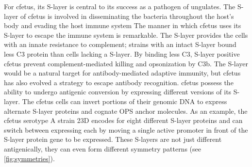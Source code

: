   For \ac{cfetus}, its \ac{S-layer} is central to its success as a pathogen of ungulates. The \ac{S-layer} of \ac{cfetus} is involved in disseminating the bacteria throughout the host's body and evading the host immune system The manner in which \ac{cfetus} uses its \ac{S-layer} to escape the immune system is remarkable. The \ac{S-layer} provides the cells with an innate resistance to complement; strains with an intact \ac{S-layer} bound less C3 protein than cells lacking a \ac{S-layer}. By binding less C3, \ac{S-layer} positive \ac{cfetus} prevent complement-mediated killing and opsonization by C3b. The \ac{S-layer} would be a natural target for antibody-mediated adaptive immunity, but \ac{cfetus} has also evolved a strategy to escape antibody recognition. \ac{cfetus} possess the ability to undergo antigenic conversion by expressing different versions of its \ac{S-layer}. The \ac{cfetus} cells can invert portions of their genomic DNA to express alternate \ac{S-layer} proteins and cognate \ac{OPS} anchor molecules. As an example, the \ac{cfetus} serotype A strain 23D encodes for eight different \ac{S-layer} proteins and can switch between expressing each by moving a single active promoter in front of the \ac{S-layer} protein gene to be expressed. These \acp{S-layer} are not just different antigenically, they can even form different symmetry patterns (see \cref{fig:symmetries}).

